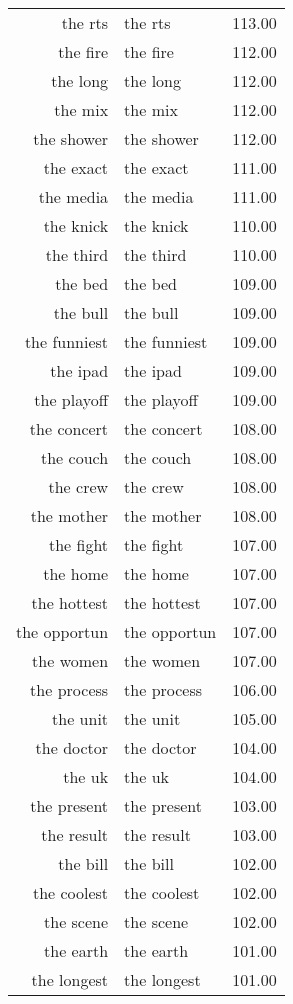 \begin{table}[ht]
\begin{tabular}{rlr}
  the rts & the rts & 113.00 \\ 
  the fire & the fire & 112.00 \\ 
  the long & the long & 112.00 \\ 
  the mix & the mix & 112.00 \\ 
  the shower & the shower & 112.00 \\ 
  the exact & the exact & 111.00 \\ 
  the media & the media & 111.00 \\ 
  the knick & the knick & 110.00 \\ 
  the third & the third & 110.00 \\ 
  the bed & the bed & 109.00 \\ 
  the bull & the bull & 109.00 \\ 
  the funniest & the funniest & 109.00 \\ 
  the ipad & the ipad & 109.00 \\ 
  the playoff & the playoff & 109.00 \\ 
  the concert & the concert & 108.00 \\ 
  the couch & the couch & 108.00 \\ 
  the crew & the crew & 108.00 \\ 
  the mother & the mother & 108.00 \\ 
  the fight & the fight & 107.00 \\ 
  the home & the home & 107.00 \\ 
  the hottest & the hottest & 107.00 \\ 
  the opportun & the opportun & 107.00 \\ 
  the women & the women & 107.00 \\ 
  the process & the process & 106.00 \\ 
  the unit & the unit & 105.00 \\ 
  the doctor & the doctor & 104.00 \\ 
  the uk & the uk & 104.00 \\ 
  the present & the present & 103.00 \\ 
  the result & the result & 103.00 \\ 
  the bill & the bill & 102.00 \\ 
  the coolest & the coolest & 102.00 \\ 
  the scene & the scene & 102.00 \\ 
  the earth & the earth & 101.00 \\ 
  the longest & the longest & 101.00 \\ 

\end{tabular}
\end{table}
